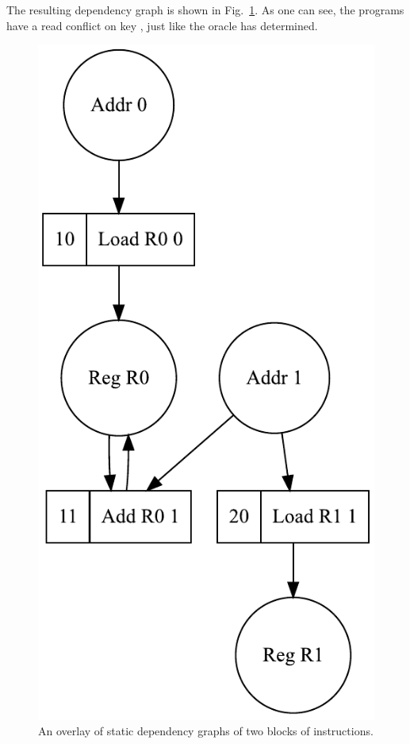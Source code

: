 \noindent
The resulting dependency graph is shown in Fig.~\ref{fig-example-graph}.
As one can see, the programs have a read conflict on key ,
just like the oracle has determined.

\begin{figure}
\vspace{-4mm}
\centerline{\includegraphics[scale=0.6]{img/oracle2.pdf}}
\vspace{-3mm}
\caption{An overlay of static dependency graphs of two blocks of instructions.\label{fig-example-graph}}
\vspace{-9mm}
\end{figure}
